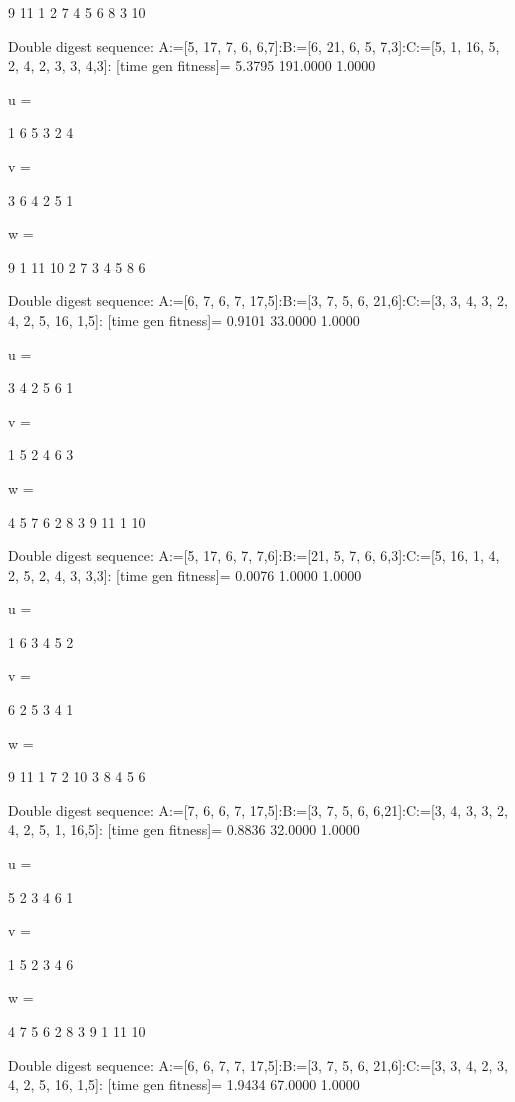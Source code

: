      9    11     1     2     7     4     5     6     8     3    10

Double digest sequence:
A:=[5, 17, 7, 6, 6,7]:B:=[6, 21, 6, 5, 7,3]:C:=[5, 1, 16, 5, 2, 4, 2, 3, 3, 4,3]:
[time gen fitness]=
    5.3795  191.0000    1.0000


u =

     1     6     5     3     2     4


v =

     3     6     4     2     5     1


w =

     9     1    11    10     2     7     3     4     5     8     6

Double digest sequence:
A:=[6, 7, 6, 7, 17,5]:B:=[3, 7, 5, 6, 21,6]:C:=[3, 3, 4, 3, 2, 4, 2, 5, 16, 1,5]:
[time gen fitness]=
    0.9101   33.0000    1.0000


u =

     3     4     2     5     6     1


v =

     1     5     2     4     6     3


w =

     4     5     7     6     2     8     3     9    11     1    10

Double digest sequence:
A:=[5, 17, 6, 7, 7,6]:B:=[21, 5, 7, 6, 6,3]:C:=[5, 16, 1, 4, 2, 5, 2, 4, 3, 3,3]:
[time gen fitness]=
    0.0076    1.0000    1.0000


u =

     1     6     3     4     5     2


v =

     6     2     5     3     4     1


w =

     9    11     1     7     2    10     3     8     4     5     6

Double digest sequence:
A:=[7, 6, 6, 7, 17,5]:B:=[3, 7, 5, 6, 6,21]:C:=[3, 4, 3, 3, 2, 4, 2, 5, 1, 16,5]:
[time gen fitness]=
    0.8836   32.0000    1.0000


u =

     5     2     3     4     6     1


v =

     1     5     2     3     4     6


w =

     4     7     5     6     2     8     3     9     1    11    10

Double digest sequence:
A:=[6, 6, 7, 7, 17,5]:B:=[3, 7, 5, 6, 21,6]:C:=[3, 3, 4, 2, 3, 4, 2, 5, 16, 1,5]:
[time gen fitness]=
    1.9434   67.0000    1.0000


